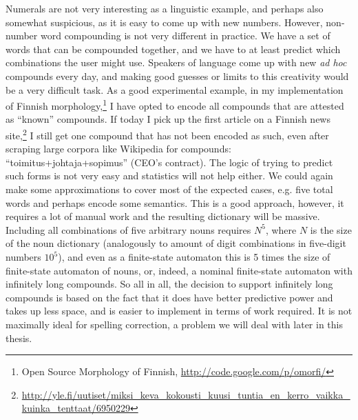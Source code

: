 \documentclass[officiallayout,final]{unihelcompling}
\begin{document}
Numerals are not very interesting as a linguistic example, and perhaps also
somewhat suspicious, as it is easy to come up with new numbers. However,
non-number word compounding is not very different in practice. We have a set of
words that can be compounded together, and we have to at least predict which
combinations the user might use. Speakers of language come up with new \emph{ad
hoc} compounds every day, and making good guesses or limits to this creativity
would be a very difficult task. As a good experimental example, in my
implementation of Finnish morphology,\footnote{Open Source Morphology of
Finnish, \url{http://code.google.com/p/omorfi/}} I have opted to encode all
compounds that are attested as ``known'' compounds. If today I pick up the
first article on a Finnish news
site,\footnote{\url{http://yle.fi/uutiset/miksi_keva_kokousti_kuusi_tuntia_en_kerro_vaikka_kuinka_tenttaat/6950229}}
I still get one compound that has not been encoded as such, even after
\gls{scraping} large corpora like Wikipedia for compounds:
``toimitus+johtaja+sopimus'' (CEO's contract). The logic of trying to predict
such forms is not very easy and statistics will not help either. We could again
make some approximations to cover most of the expected cases, e.g. five total
words and perhaps encode some semantics. This is a good approach, however, it
requires a lot of manual work and the resulting dictionary will be massive.
Including all combinations of five arbitrary nouns requires $N^5$, where $N$ is
the size of the noun dictionary (analogously to amount of digit combinations in
five-digit numbers $10^5$), and even as a finite-state automaton this is 5
times the size of finite-state automaton of nouns, or, indeed, a nominal
finite-state automaton with infinitely long compounds. So all in all, the
decision to support infinitely long compounds is based on the fact that it does
have better predictive power and takes up less space, and is easier to
implement in terms of work required.  It is not maximally ideal for spelling
correction, a problem we will deal with later in this thesis.
\end{document}
